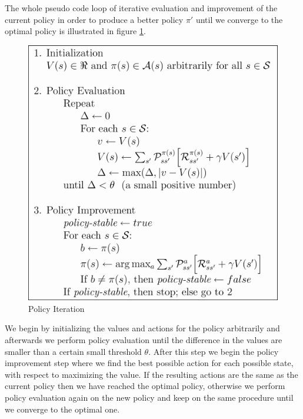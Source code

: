 \documentclass[paper=a4, fontsize=11pt]{scrartcl}
\numberwithin{equation}{section}		%
\numberwithin{figure}{section}			%
\numberwithin{table}{section}				%
\begin{document}
The whole pseudo code loop of iterative evaluation and improvement of the current policy in order to produce a better policy $\pi'$ until we converge to the optimal policy is illustrated in figure \ref{Policy Iteration}.

\begin{figure}[H] \centering
\includegraphics[scale=0.55]{pseudotmp1.png}
\caption{Policy Iteration ~\cite{suttonBarto}} \label{Policy Iteration}
\end{figure}

We begin by initializing the values and actions for the policy arbitrarily and afterwards we perform policy evaluation until the difference in the values are smaller than a certain small threshold $\theta$. After this step we begin the policy improvement step where we find the best possible action for each possible state, with respect to maximizing the value. If the resulting actions are the same as the current policy then we have reached the optimal policy, otherwise we perform policy evaluation again on the new policy and keep on the same procedure until we converge to the optimal one. 
\end{document}
